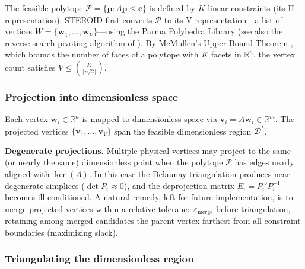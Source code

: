\documentclass[review,onefignum,onetabnum]{./SIAM_template/siamart171218}
\begin{document}
The feasible polytope $\mathcal{P} = \{\mathbf{p} : \Lambda\mathbf{p} \leq
	\mathbf{c}\}$ is defined by $K$ linear constraints (its H-representation).
STEROID first converts $\mathcal{P}$ to its V-representation---a list of vertices
$W = \{\mathbf{w}_1, \ldots, \mathbf{w}_V\}$---using the Parma Polyhedra
Library \cite{PPL2008} (see also the reverse-search pivoting algorithm of
\cite{Avis1992}).
By McMullen's Upper Bound Theorem \cite{McMullen1970},
which bounds the number of faces of a polytope with $K$ facets in $\mathbb{R}^n$,
the vertex count satisfies $V \leq \binom{K}{\lfloor n/2 \rfloor}$.

\subsubsection{Projection into dimensionless space}
\label{sec:proj_dim_subspace}

Each vertex $\mathbf{w}_i \in \mathbb{R}^n$ is mapped to dimensionless space via
$\mathbf{v}_i = A\mathbf{w}_i \in \mathbb{R}^m$.  The projected vertices
$\{\mathbf{v}_1, \ldots, \mathbf{v}_V\}$ span the feasible dimensionless region
$\mathcal{D}^*$.

\textbf{Degenerate projections.}  Multiple physical vertices may project to the same
(or nearly the same) dimensionless point when the polytope $\mathcal{P}$ has edges
nearly aligned with $\ker(A)$.  In this case the Delaunay triangulation produces
near-degenerate simplices ($\det P_i \approx 0$), and the deprojection matrix
$E_i = P_i' P_i^{-1}$ becomes ill-conditioned.  A natural remedy, left for future implementation, is to merge projected
vertices within a relative tolerance $\varepsilon_{\mathrm{merge}}$ before
triangulation, retaining among merged candidates the parent vertex farthest
from all constraint boundaries (maximizing slack).

\subsubsection{Triangulating the dimensionless region}
\end{document}
